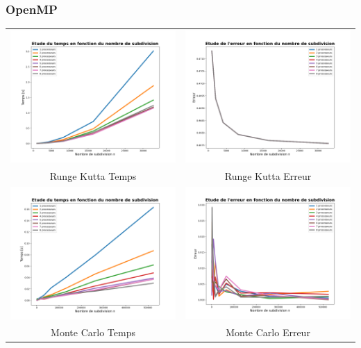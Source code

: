 \documentclass[10pt]{beamer}
\begin{document}
\begin{frame}
    \frametitle{OpenMP}
        \small
    \begin{tabular}{cc}
        \includegraphics[width=0.45\linewidth]{Images/time_RK_Op_MP.png} &
        \includegraphics[width=0.45\linewidth]{Images/error_RK_Op_MP.png} \\
        Runge Kutta Temps & Runge Kutta Erreur \\
        \includegraphics[width=0.45\linewidth]{Images/time_montecarlo_Op_MP.png} &
        \includegraphics[width=0.45\linewidth]{Images/error_montecarlo_Op_MP.png} \\
        Monte Carlo Temps & Monte Carlo Erreur\\
    \end{tabular}
        
\end{frame}
        
\end{document}
